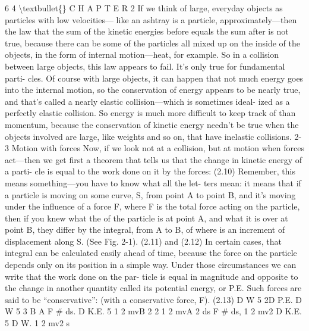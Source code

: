 \documentclass[10pt,oneside]{article}
\begin{document}
6 4 \textbackslash{}textbullet\{\} C H A P T E R  2 If we think of large, everyday objects as particles with low velocities--- like an ashtray is a particle, approximately---then the law that the sum of the kinetic energies before equals the sum after is not true, because there can be some of the particles all mixed up on the inside of the objects, in the form of internal motion---heat, for example. So in a collision between large objects, this law appears to fail. It’s only true for fundamental parti- cles. Of course with large objects, it can happen that not much energy goes into the internal motion, so the conservation of energy appears to be nearly true, and that’s called a nearly elastic collision---which is sometimes ideal- ized as a perfectly elastic collision. So energy is much more difficult to keep track of than momentum, because the conservation of kinetic energy needn’t be true when the objects involved are large, like weights and so on, that have inelastic collisions. 2-3 Motion with forces Now, if we look not at a collision, but at motion when forces act---then we get first a theorem that tells us that the change in kinetic energy of a parti- cle is equal to the work done on it by the forces: (2.10) Remember, this means something---you have to know what all the let- ters mean: it means that if a particle is moving on some curve, S, from point A to point B, and it’s moving under the influence of a force F, where F is the total force acting on the particle, then if you knew what the of the particle is at point A, and what it is over at point B, they differ by the integral, from A to B, of where is an increment of displacement along S. (See Fig. 2-1). (2.11) and (2.12) In certain cases, that integral can be calculated easily ahead of time, because the force on the particle depends only on its position in a simple way. Under those circumstances we can write that the work done on the par- ticle is equal in magnitude and opposite to the change in another quantity called its potential energy, or P.E. Such forces are said to be “conservative”: (with a conservative force, F). (2.13) D W 5 2D P.E. D W 5 3 B A F \# ds. D K.E. 5 1 2 mvB 2 2 1 2 mvA 2 ds F \# ds, 1 2 mv2 D K.E. 5 D W. 1 2 mv2 s\par
\end{document}
